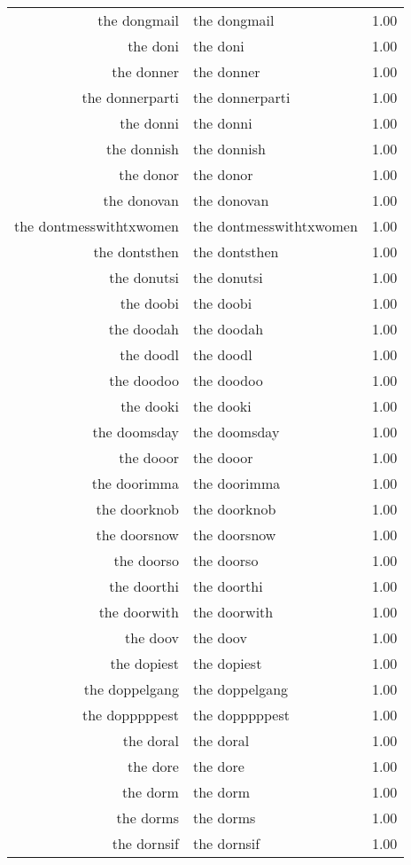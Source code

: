 \begin{table}[ht]
\begin{tabular}{rlr}
  the dongmail & the dongmail & 1.00 \\ 
  the doni & the doni & 1.00 \\ 
  the donner & the donner & 1.00 \\ 
  the donnerparti & the donnerparti & 1.00 \\ 
  the donni & the donni & 1.00 \\ 
  the donnish & the donnish & 1.00 \\ 
  the donor & the donor & 1.00 \\ 
  the donovan & the donovan & 1.00 \\ 
  the dontmesswithtxwomen & the dontmesswithtxwomen & 1.00 \\ 
  the dontsthen & the dontsthen & 1.00 \\ 
  the donutsi & the donutsi & 1.00 \\ 
  the doobi & the doobi & 1.00 \\ 
  the doodah & the doodah & 1.00 \\ 
  the doodl & the doodl & 1.00 \\ 
  the doodoo & the doodoo & 1.00 \\ 
  the dooki & the dooki & 1.00 \\ 
  the doomsday & the doomsday & 1.00 \\ 
  the dooor & the dooor & 1.00 \\ 
  the doorimma & the doorimma & 1.00 \\ 
  the doorknob & the doorknob & 1.00 \\ 
  the doorsnow & the doorsnow & 1.00 \\ 
  the doorso & the doorso & 1.00 \\ 
  the doorthi & the doorthi & 1.00 \\ 
  the doorwith & the doorwith & 1.00 \\ 
  the doov & the doov & 1.00 \\ 
  the dopiest & the dopiest & 1.00 \\ 
  the doppelgang & the doppelgang & 1.00 \\ 
  the dopppppest & the dopppppest & 1.00 \\ 
  the doral & the doral & 1.00 \\ 
  the dore & the dore & 1.00 \\ 
  the dorm & the dorm & 1.00 \\ 
  the dorms & the dorms & 1.00 \\ 
  the dornsif & the dornsif & 1.00 \\ 

\end{tabular}
\end{table}
